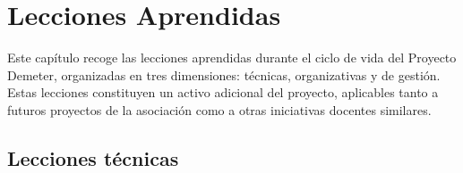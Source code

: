 \chapter{Lecciones Aprendidas}
\label{cap:lecciones}

Este cap\'itulo recoge las lecciones aprendidas durante el ciclo de vida
del Proyecto Demeter, organizadas en tres dimensiones: t\'ecnicas,
organizativas y de gesti\'on. Estas lecciones constituyen un activo
adicional del proyecto, aplicables tanto a futuros proyectos de la
asociaci\'on como a otras iniciativas docentes similares.

\section{Lecciones t\'ecnicas}

